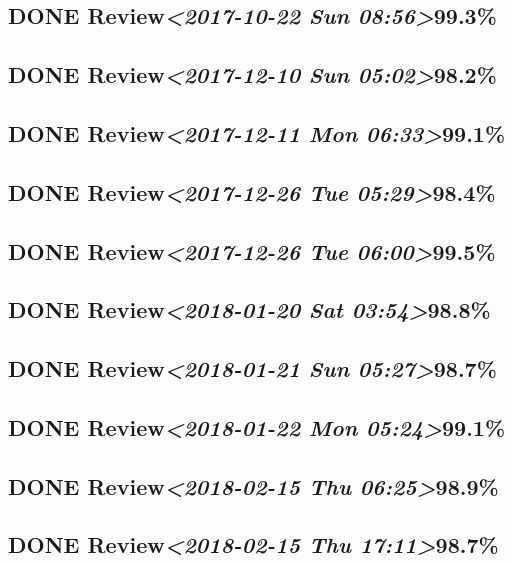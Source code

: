 \documentclass[11pt]{ctexart}
\begin{document}
\subsection{{\bfseries\sffamily DONE} Review\textit{<2017-10-22 Sun 08:56>}99.3\%}
\label{sec:orgf1a67f3}

\subsection{{\bfseries\sffamily DONE} Review\textit{<2017-12-10 Sun 05:02>}98.2\%}
\label{sec:orgcdb12c3}
\subsection{{\bfseries\sffamily DONE} Review\textit{<2017-12-11 Mon 06:33>}99.1\%}
\label{sec:org04ab198}
\subsection{{\bfseries\sffamily DONE} Review\textit{<2017-12-26 Tue 05:29>}98.4\%}
\label{sec:org1ee93e7}
\subsection{{\bfseries\sffamily DONE} Review\textit{<2017-12-26 Tue 06:00>}99.5\%}
\label{sec:org93b6b62}
\subsection{{\bfseries\sffamily DONE} Review\textit{<2018-01-20 Sat 03:54>}98.8\%}
\label{sec:orga742fd9}
\subsection{{\bfseries\sffamily DONE} Review\textit{<2018-01-21 Sun 05:27>}98.7\%}
\label{sec:org4b230fd}
\subsection{{\bfseries\sffamily DONE} Review\textit{<2018-01-22 Mon 05:24>}99.1\%}
\label{sec:orgad28b13}
\subsection{{\bfseries\sffamily DONE} Review\textit{<2018-02-15 Thu 06:25>}98.9\%}
\label{sec:org424de65}
\subsection{{\bfseries\sffamily DONE} Review\textit{<2018-02-15 Thu 17:11>}98.7\%}
\label{sec:orgb0dfc70}
\end{document}
